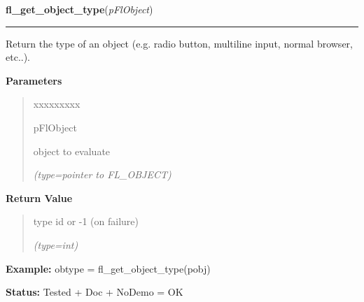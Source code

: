 \hspace{.8\funcindent}\begin{boxedminipage}{\funcwidth}

    \raggedright \textbf{fl\_get\_object\_type}(\textit{pFlObject})

    \vspace{-1.5ex}

    \rule{\textwidth}{0.5\fboxrule}
\setlength{\parskip}{2ex}
    Return the type of an object (e.g. radio button, multiline input, 
    normal browser, etc..).

\setlength{\parskip}{1ex}
      \textbf{Parameters}
      \vspace{-1ex}

      \begin{quote}
        \begin{Ventry}{xxxxxxxxx}

          \item[pFlObject]

          object to evaluate

            {\it (type=pointer to FL\_OBJECT)}

        \end{Ventry}

      \end{quote}

      \textbf{Return Value}
    \vspace{-1ex}

      \begin{quote}
      type id or -1 (on failure)

      {\it (type=int)}

      \end{quote}

\textbf{Example:} obtype = fl\_get\_object\_type(pobj)



\textbf{Status:} Tested + Doc + NoDemo = OK



    \end{boxedminipage}

    \label{xformslib:flbasic:fl_set_object_boxtype}

    \vspace{0.5ex}

